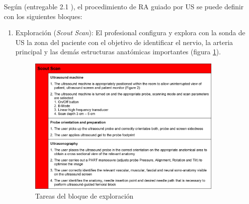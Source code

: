 Según (entregable 2.1 \cite{rasimasweb}), el procedimiento de \ac{RA} guiado por \ac{US} se puede definir con los siguientes bloques:
\begin{enumerate}
    \item Exploración (\emph{Scout Scan}): El profesional configura y explora con la sonda de \ac{US} la zona del paciente con el objetivo de identificar el nervio, la arteria principal y las demás estructuras anatómicas importantes (figura \ref{fig:scoutscan}). 
\begin{figure}[th]
   \centering
    \includegraphics[width=0.9\textwidth]{IMG/scoutscan.png}
    \caption{Tareas del bloque de exploración }
   \label{fig:scoutscan}
   

\end{figure}
\end{enumerate}
